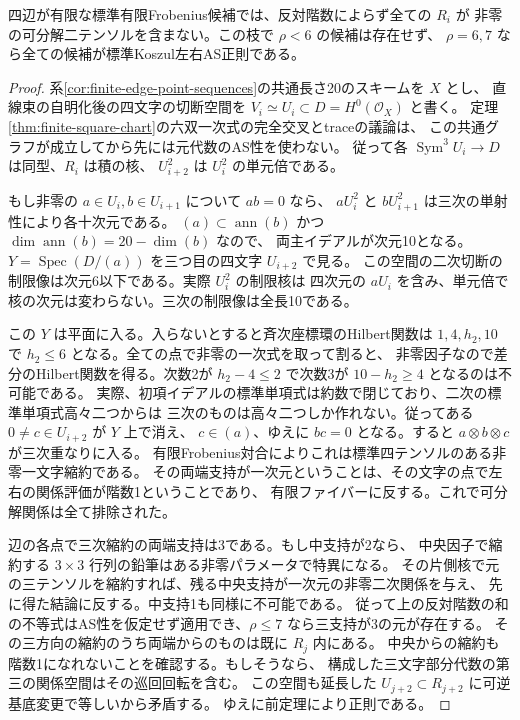 \begin{theorem}\label{thm:finite-frobenius-low-opposite-as}
四辺が有限な標準有限Frobenius候補では、反対階数によらず全ての $R_i$ が
非零の可分解二テンソルを含まない。この枝で $\rho<6$ の候補は存在せず、
$\rho=6,7$ なら全ての候補が標準Koszul左右AS正則である。
\end{theorem}
\begin{proof}
系\ref{cor:finite-edge-point-sequences}の共通長さ20のスキームを $X$ とし、
直線束の自明化後の四文字の切断空間を $V_i\simeq U_i\subset D=H^0(\mathcal O_X)$ と書く。
定理\ref{thm:finite-square-chart}の六双一次式の完全交叉とtraceの議論は、
この共通グラフが成立してから先には元代数のAS性を使わない。
従って各 $\operatorname{Sym}^3 U_i\to D$ は同型、$R_i$ は積の核、
$U_{i+2}^2$ は $U_i^2$ の単元倍である。

もし非零の $a\in U_i,b\in U_{i+1}$ について $ab=0$ なら、
$a U_i^2$ と $b U_{i+1}^2$ は三次の単射性により各十次元である。
$(a)\subset\operatorname{ann}(b)$ かつ $\dim\operatorname{ann}(b)=20-\dim(b)$ なので、
両主イデアルが次元10となる。$Y=\operatorname{Spec}(D/(a))$ を三つ目の四文字 $U_{i+2}$ で見る。
この空間の二次切断の制限像は次元6以下である。実際 $U_i^2$ の制限核は
四次元の $a U_i$ を含み、単元倍で核の次元は変わらない。三次の制限像は全長10である。

この $Y$ は平面に入る。入らないとすると斉次座標環のHilbert関数は
$1,4,h_2,10$ で $h_2\le6$ となる。全ての点で非零の一次式を取って割ると、
非零因子なので差分のHilbert関数を得る。次数2が $h_2-4\le2$ で次数3が $10-h_2\ge4$ となるのは不可能である。
実際、初項イデアルの標準単項式は約数で閉じており、二次の標準単項式高々二つからは
三次のものは高々二つしか作れない。従ってある $0\ne c\in U_{i+2}$ が $Y$ 上で消え、
$c\in(a)$、ゆえに $bc=0$ となる。すると $a\otimes b\otimes c$ が三次重なりに入る。
有限Frobenius対合によりこれは標準四テンソルのある非零一文字縮約である。
その両端支持が一次元ということは、その文字の点で左右の関係評価が階数1ということであり、
有限ファイバーに反する。これで可分解関係は全て排除された。

辺の各点で三次縮約の両端支持は3である。もし中支持が2なら、
中央因子で縮約する $3\times3$ 行列の鉛筆はある非零パラメータで特異になる。
その片側核で元の三テンソルを縮約すれば、残る中央支持が一次元の非零二次関係を与え、
先に得た結論に反する。中支持1も同様に不可能である。
従って上の反対階数の和の不等式はAS性を仮定せず適用でき、$\rho\le7$ なら三支持が3の元が存在する。
その三方向の縮約のうち両端からのものは既に $R_j$ 内にある。
中央からの縮約も階数1になれないことを確認する。もしそうなら、
構成した三文字部分代数の第三の関係空間はその巡回回転を含む。
この空間も延長した $U_{j+2}\subset R_{j+2}$ に可逆基底変更で等しいから矛盾する。
ゆえに前定理により正則である。
\end{proof}
